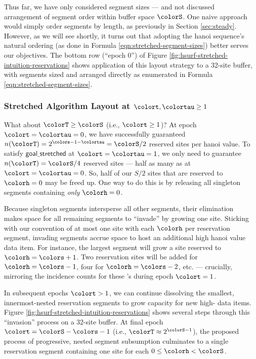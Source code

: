 Thus far, we have only considered segment sizes --- and not discussed arrangement of segment order within buffer space $\colorS$.
One naive approach would simply order segments by length, as previously in Section \ref{sec:steady}.
However, as we will see shortly, it turns out that adopting the hanoi sequence's natural ordering (as done in Formula \ref{eqn:stretched-segment-sizes}) better serves our objectives.
The bottom row (``epoch 0'') of Figure \ref{fig:hsurf-stretched-intuition-reservations} shows application of this layout strategy to a 32-site buffer, with segments sized and arranged directly as enumerated in Formula \ref{eqn:stretched-segment-sizes}.

\subsubsection{Stretched Algorithm Layout at $\colort,\colortau\geq1$}

What about $\colorT \geq \colorS$ (i.e., $\colort \geq 1$)?
At epoch $\colort=\colortau=0$, we have successfully guaranteed $n(\colorT) = 2^{\colors - 1 - \colortau} = \colorS / 2$ reserved sites per hanoi value.
To satisfy $\textsf{goal\_stretched}$ at $\colort=\colortau=1$, we only need to guarantee $n(\colorT) = \colorS/4$ reserved sites --- half as many as at $\colort=\colortau=0$.
So, half of our $S/2$ sites that are reserved to \hv{} $\colorh=0$ may be freed up.
One way to do this is by releasing all singleton segments containing \textit{only} \hv{} $\colorh=0$.

Because singleton segments intersperse all other segments, their elimination makes space for all remaining segments to ``invade'' by growing one site.
Sticking with our convention of at most one site with each \hv{} $\colorh$ per reservation segment, invading segments accrue space to host an additional high hanoi value data item.
For instance, the largest segment will grow a site reserved to \hv{} $\colorh=\colors +1$.
Two reservation sites will be added for \hv{} $\colorh=\colors - 1$, four for \hv{} $\colorh=\colors - 2$, etc. --- crucially, mirroring the incidence counts for these \hv{}'s during epoch $\colort=1$.

In subsequent epochs $\colort>1$, we can continue dissolving the smallest, innermost-nested reservation segments to grow capacity for new high-\hv{} data items.
Figure \ref{fig:hsurf-stretched-intuition-reservations} shows several steps through this ``invasion'' process on a 32-site buffer.
At final epoch $\colort=\colorS-\colors - 1$ (i.e., $\colorT \approx 2^{\colorS - 1}$), the proposed process of progressive, nested segment subsumption culminates to a single reservation segment containing one site for each \hv{} $0 \leq \colorh < \colorS$.

